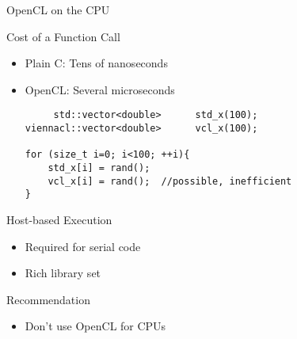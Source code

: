 

\begin{frame}[fragile]{OpenCL on the CPU}

 \begin{block}{Cost of a Function Call}
  \begin{itemize}
   \item Plain C: Tens of nanoseconds
   \item OpenCL: Several microseconds
  \begin{lstlisting}
     std::vector<double>      std_x(100);
viennacl::vector<double>      vcl_x(100);

for (size_t i=0; i<100; ++i){
    std_x[i] = rand();
    vcl_x[i] = rand();  //possible, inefficient
}
\end{lstlisting}
  \end{itemize}
 \end{block}

 \begin{block}{Host-based Execution}
  \begin{itemize}
   \item Required for serial code
   \item Rich library set
  \end{itemize}
 \end{block}

 \begin{block}{Recommendation}
  \begin{itemize}
   \item Don't use OpenCL for CPUs
  \end{itemize}
 \end{block}
 
\end{frame}

